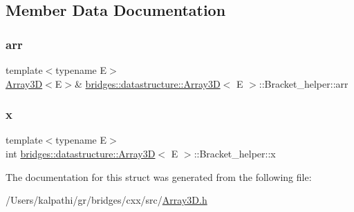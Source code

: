 \subsection{Member Data Documentation}
\mbox{\label{structbridges_1_1datastructure_1_1_array3_d_1_1_bracket__helper_a103a7f1a8a32dd0109f9ef278407d49f}} 
\subsubsection{\texorpdfstring{arr}{arr}}
{\footnotesize\ttfamily template$<$typename E$>$ \\
\mbox{\hyperlink{classbridges_1_1datastructure_1_1_array3_d}{Array3D}}$<$E$>$\& \mbox{\hyperlink{classbridges_1_1datastructure_1_1_array3_d}{bridges\+::datastructure\+::\+Array3D}}$<$ E $>$\+::Bracket\+\_\+helper\+::arr}

\mbox{\label{structbridges_1_1datastructure_1_1_array3_d_1_1_bracket__helper_a66c392b3d6f3a326f632099c596d175c}} 
\subsubsection{\texorpdfstring{x}{x}}
{\footnotesize\ttfamily template$<$typename E$>$ \\
int \mbox{\hyperlink{classbridges_1_1datastructure_1_1_array3_d}{bridges\+::datastructure\+::\+Array3D}}$<$ E $>$\+::Bracket\+\_\+helper\+::x}



The documentation for this struct was generated from the following file\+:\begin{DoxyCompactItemize}
\item 
/\+Users/kalpathi/gr/bridges/cxx/src/\mbox{\hyperlink{_array3_d_8h}{Array3\+D.\+h}}\end{DoxyCompactItemize}
